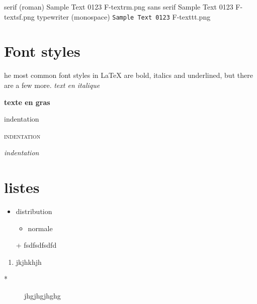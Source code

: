serif (roman)	\textrm{Sample Text 0123}	\rmfamily	F-textrm.png
sans serif	\textsf{Sample Text 0123}	\sffamily	F-textsf.png
typewriter (monospace)	\texttt{Sample Text 0123}	\ttfamily	F-texttt.png

\section{Font styles}
he most common font styles in LaTeX are bold, italics and underlined, but there are a few more.
\textit {text en italique}

\textbf {texte en gras}

\textrm {indentation}

\textsc {indentation}

\emph {indentation}



\section{listes}
\begin{itemize}
  \item distribution \\
      \begin{itemize}
        \item normale
      \end{itemize}
\end{itemize}

\begin{itemize}
  \item [+] fsdfsdfsdfd
\end{itemize}


\begin{enumerate}
  \item jkjhkhjh \\
\end{enumerate}


\begin{description}
  \item[*] jhgjhgjhghg\\
\end{description}

